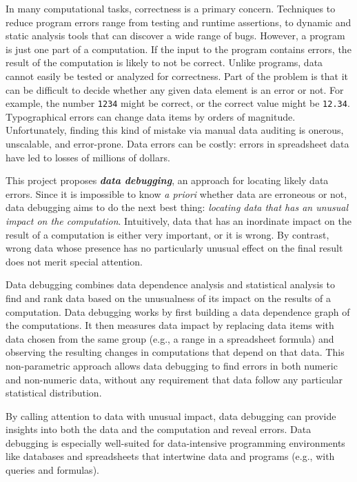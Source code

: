 \projectname{}

In many computational tasks, correctness is a primary
concern. Techniques to reduce program errors range from testing and
runtime assertions, to dynamic and static analysis tools that can
discover a wide range of bugs. However, a program is just one part of
a computation. If the input to the program contains errors, the result
of the computation is likely to not be correct. Unlike programs, data
cannot easily be tested or analyzed for correctness.  Part of the
problem is that it can be difficult to decide whether any given data
element is an error or not. For example, the number \texttt{1234}
might be correct, or the correct value might
be \texttt{12.34}. Typographical errors can change data items by
orders of magnitude. Unfortunately, finding this kind of mistake via
manual data auditing is onerous, unscalable, and error-prone. Data
errors can be costly: errors in spreadsheet data have led to losses of
millions of dollars.

This project proposes \emph{\bf data debugging}, an approach for
locating likely data errors. Since it is impossible to know \emph{a
priori} whether data are erroneous or not, data debugging aims to do
the next best thing: \emph{locating data that has an unusual impact on
the computation}. Intuitively, data that has an inordinate impact on
the result of a computation is either very important, or it is wrong. By
contrast, wrong data whose presence has no particularly unusual effect
on the final result does not merit special attention.

Data debugging combines data dependence analysis and statistical
analysis to find and rank data based on the unusualness of its impact
on the results of a computation. Data debugging works by first
building a data dependence graph of the computations. It then measures
data impact by replacing data items with data chosen from the same
group (e.g., a range in a spreadsheet formula) and observing the
resulting changes in computations that depend on that data. This
non-parametric approach allows data debugging to find errors in both
numeric and non-numeric data, without any requirement that data follow
any particular statistical distribution.

By calling attention to data with unusual impact, data debugging can
provide insights into both the data and the computation and reveal
errors. Data debugging is especially well-suited for data-intensive
programming environments like databases and spreadsheets that
intertwine data and programs (e.g., with queries and formulas). 

